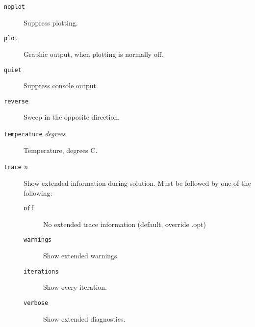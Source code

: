 \begin{description}


\item[{\tt noplot}]
Suppress plotting.

\item[{\tt plot}]
Graphic output, when plotting is normally off.

\item[{\tt quiet}]
Suppress console output.


\item[{\tt reverse}]
Sweep in the opposite direction.


\item[{\tt temperature} {\it degrees}]
Temperature, degrees C.

\item[{\tt trace} {\it n}]
Show extended information during solution.
Must be followed by one of the following:
\begin{description}
\item[{\tt off}] No extended trace information (default, override .opt)
\item[{\tt warnings}] Show extended warnings
\item[{\tt iterations}] Show every iteration.
\item[{\tt verbose}] Show extended diagnostics.
\end{description}


\end{description}
